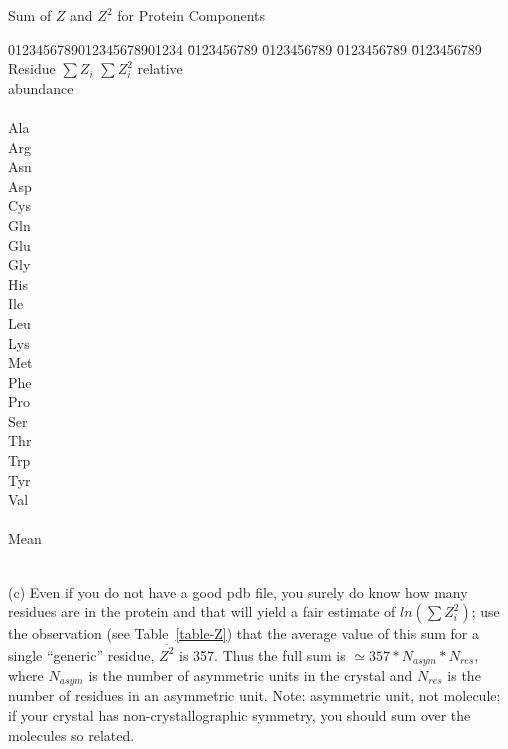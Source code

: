 \documentclass{report}
\begin{document}
\begin{table} [bht]
\caption {Sum of $Z$ and $Z^2$ for Protein Components}
\label{table-Z}

\begin{tabbing}
0123456789012345678901234 \= 0123456789 \= 0123456789  \= 0123456789  \= 0123456789 \kill
\\
\> Residue   \> $\sum{Z_i}$  \> $\sum{Z_i^2}$  \>  relative \\
\> \> \> \>  abundance\cite{creighton} \\
\\
\> Ala    \\
\> Arg    \\
\> Asn    \\
\> Asp    \\
\> Cys    \\
\> Gln    \\
\> Glu    \\
\> Gly    \\
\> His    \\
\> Ile    \\
\> Leu    \\
\> Lys    \\
\> Met    \\
\> Phe    \\
\> Pro    \\
\> Ser    \\
\> Thr    \\
\> Trp    \\
\> Tyr    \\
\> Val    \\
\\
\> Mean     \\
\\
\end{tabbing} 
\end{table}

(c) Even if you do not have a good pdb file, you surely do know how many 
residues are in the protein and that will yield a fair estimate of 
$ln(\sum{Z_i^2})$; use the observation (see Table~\ref{table-Z}) 
that the average value of this sum for a single
``generic'' residue, $\overline{Z^2}$ is 357.  
Thus the full sum is $\simeq 357 * N_{asym} * N_{res}$,
where $N_{asym}$ is the number of asymmetric units in the crystal and 
$N_{res}$ is
the number of residues in an asymmetric unit.  Note: asymmetric unit, 
not molecule; if your crystal has non-crystallographic symmetry,
you should sum over the molecules so related.
\end{document}
